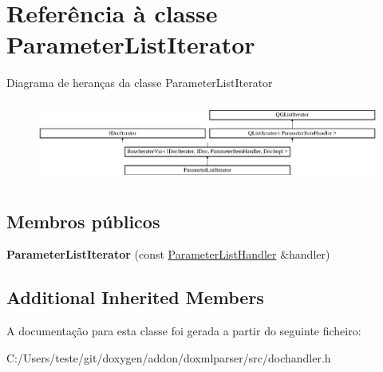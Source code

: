 \hypertarget{class_parameter_list_iterator}{\section{Referência à classe Parameter\-List\-Iterator}
\label{class_parameter_list_iterator}
}
Diagrama de heranças da classe Parameter\-List\-Iterator\begin{figure}[H]
\begin{center}
\leavevmode
\includegraphics[height=2.666667cm]{class_parameter_list_iterator}
\end{center}
\end{figure}
\subsection*{Membros públicos}
\begin{DoxyCompactItemize}
\item 
\hypertarget{class_parameter_list_iterator_a37da8435ba0e85cfb467cd3ea0c50ef6}{{\bfseries Parameter\-List\-Iterator} (const \hyperlink{class_parameter_list_handler}{Parameter\-List\-Handler} \&handler)}\label{class_parameter_list_iterator_a37da8435ba0e85cfb467cd3ea0c50ef6}

\end{DoxyCompactItemize}
\subsection*{Additional Inherited Members}


A documentação para esta classe foi gerada a partir do seguinte ficheiro\-:\begin{DoxyCompactItemize}
\item 
C\-:/\-Users/teste/git/doxygen/addon/doxmlparser/src/dochandler.\-h\end{DoxyCompactItemize}
